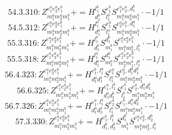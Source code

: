 \documentclass[letterpaper,10pt,fleqn,leqno,onecolumn]{article}
\begin{document}
\begin{equation} \;\;\;\;\;\;  54.3.310: Z^{e_{1}^{a}e_{2}^{a}e_{1}^{b}}_{m_{1}^{a}m_{2}^{a}m_{1}^{b}}+=H^{l_{1}^{b}}_{d_{1}^{b}}S^{e_{1}^{b}}_{l_{1}^{b}}S^{e_{1}^{a}e_{2}^{a},d_{1}^{b}}_{m_{1}^{a}m_{2}^{a}m_{1}^{b}}\cdot -1/1 \end{equation}
\begin{equation} \;\;\;\;\;\;  54.5.312: Z^{e_{1}^{a}e_{2}^{a}e_{1}^{b}}_{m_{1}^{a}m_{2}^{a}m_{1}^{b}}+=H^{l_{1}^{a}}_{d_{1}^{a}}S^{e_{1}^{a}}_{l_{1}^{a}}S^{e_{2}^{a}e_{1}^{b},d_{1}^{a}}_{m_{1}^{a}m_{2}^{a}m_{1}^{b}}\cdot -1/1 \end{equation}
\begin{equation} \;\;\;\;\;\;  55.3.316: Z^{e_{1}^{a}e_{2}^{a}e_{1}^{b}}_{m_{1}^{a}m_{2}^{a}m_{1}^{b}}+=H^{l_{1}^{b}}_{d_{1}^{b}}S^{d_{1}^{b}}_{m_{1}^{b}}S^{e_{1}^{a}e_{2}^{a}e_{1}^{b}}_{m_{1}^{a}m_{2}^{a},l_{1}^{b}}\cdot -1/1 \end{equation}
\begin{equation} \;\;\;\;\;\;  55.5.318: Z^{e_{1}^{a}e_{2}^{a}e_{1}^{b}}_{m_{1}^{a}m_{2}^{a}m_{1}^{b}}+=H^{l_{1}^{a}}_{d_{1}^{a}}S^{d_{1}^{a}}_{m_{1}^{a}}S^{e_{1}^{a}e_{2}^{a}e_{1}^{b}}_{m_{2}^{a}m_{1}^{b},l_{1}^{a}}\cdot -1/1 \end{equation}
\begin{equation} \;\;\;\;\;\;  56.4.323: Z^{e_{1}^{a}e_{2}^{a}e_{1}^{b}}_{m_{1}^{a}m_{2}^{a}m_{1}^{b}}+=H^{e_{1}^{b},l_{1}^{a}}_{d_{1}^{a}d_{1}^{b}}S^{e_{1}^{a}}_{l_{1}^{a}}S^{e_{2}^{a},d_{1}^{a}d_{1}^{b}}_{m_{1}^{a}m_{2}^{a}m_{1}^{b}}\cdot -1/1 \end{equation}
\begin{equation} \;\;\;\;\;\;  56.6.325: Z^{e_{1}^{a}e_{2}^{a}e_{1}^{b}}_{m_{1}^{a}m_{2}^{a}m_{1}^{b}}+=H^{e_{1}^{a},l_{1}^{b}}_{d_{1}^{a}d_{1}^{b}}S^{e_{1}^{b}}_{l_{1}^{b}}S^{e_{2}^{a},d_{1}^{a}d_{1}^{b}}_{m_{1}^{a}m_{2}^{a}m_{1}^{b}} \end{equation}
\begin{equation} \;\;\;\;\;\;  56.7.326: Z^{e_{1}^{a}e_{2}^{a}e_{1}^{b}}_{m_{1}^{a}m_{2}^{a}m_{1}^{b}}+=H^{e_{1}^{a},l_{1}^{a}}_{d_{1}^{a}d_{2}^{a}}S^{e_{2}^{a}}_{l_{1}^{a}}S^{e_{1}^{b},d_{1}^{a}d_{2}^{a}}_{m_{1}^{a}m_{2}^{a}m_{1}^{b}}\cdot -1/1 \end{equation}
\begin{equation} \;\;\;\;\;\;  57.3.330: Z^{e_{1}^{a}e_{2}^{a}e_{1}^{b}}_{m_{1}^{a}m_{2}^{a}m_{1}^{b}}+=H^{e_{1}^{b},l_{1}^{b}}_{d_{1}^{b},d_{2}^{b}}S^{d_{1}^{b}}_{m_{1}^{b}}S^{e_{1}^{a}e_{2}^{a},d_{2}^{b}}_{m_{1}^{a}m_{2}^{a},l_{1}^{b}} \end{equation}
\end{document}
